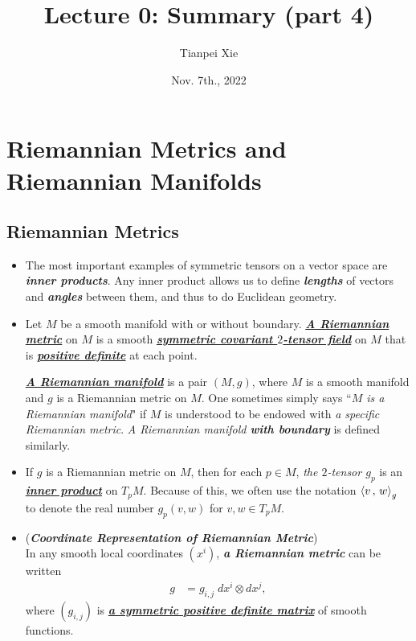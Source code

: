 \documentclass[11pt]{article}
\begin{document}
\title{Lecture 0: Summary (part 4)}
\author{ Tianpei Xie}
\date{Nov. 7th., 2022}
\maketitle
\tableofcontents
\newpage
\section{Riemannian Metrics and Riemannian Manifolds}
\subsection{Riemannian Metrics}
\begin{itemize}
\item \begin{remark}
The most important examples of symmetric tensors on a vector space are \emph{\textbf{inner products}}. Any inner product allows us to define \emph{\textbf{lengths}} of vectors and \emph{\textbf{angles}} between them, and thus to do Euclidean geometry.
\end{remark}

\item \begin{definition}
Let $M$ be a smooth manifold with or without boundary. \underline{\emph{\textbf{A Riemannian metric}}} on $M$ is a smooth \underline{\emph{\textbf{symmetric covariant $2$-tensor field}}} on $M$ that is \underline{\emph{\textbf{positive definite}}} at each point. 

\underline{\emph{\textbf{A Riemannian manifold}}} is a pair $(M, g)$, where $M$ is a smooth manifold and $g$ is a Riemannian metric on $M$. One sometimes simply says ``\emph{$M$ is a Riemannian manifold}" if $M$ is understood to be endowed with \emph{a specific Riemannian metric}. \emph{A Riemannian manifold \textbf{with boundary}} is defined similarly.
\end{definition}

\item \begin{remark}
If $g$ is a Riemannian metric on $M$, then for each $p \in M$, \emph{the $2$-tensor $g_p$} is an \underline{\emph{\textbf{inner product}}} on $T_{p}M$. Because of this, we often use the notation $\left\langle v\,,\, w \right\rangle_g$ to denote the real number $g_p(v, w)$ for $v,w \in T_{p}M$.
\end{remark}

\item \begin{remark} (\emph{\textbf{Coordinate Representation of Riemannian Metric}})\\
In any smooth local coordinates  $(x^i)$, \emph{\textbf{a Riemannian metric}} can be written 
\begin{align}
g &= g_{i,j}\;dx^i \otimes dx^j, \label{eqn: riemannian_metric_tensor_product}
\end{align} where $(g_{i,j})$ is \underline{\emph{\textbf{a symmetric positive definite matrix}}} of smooth functions. 
\end{remark}


\end{itemize}
\end{document}
